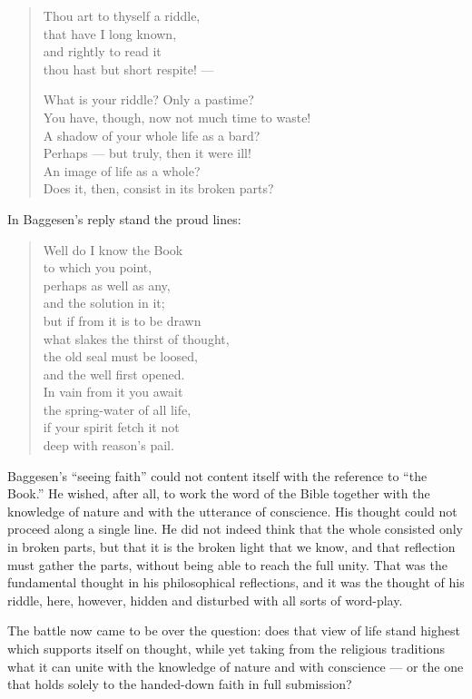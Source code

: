 \documentclass[12pt,a4paper]{book}
\newcommand{\opage}[1]{\marginnote{\footnotesize\textit{[#1]}}}
\begin{document}
\begin{verse}
Thou art to thyself a riddle,\\
that have I long known,\\
and rightly to read it\\
thou hast but short respite! ---

What is your riddle? Only a pastime?\\
You have, though, now not much time to waste!\\
A shadow of your whole life as a bard?\\
Perhaps --- but truly, then it were ill!\\
An image of life as a whole?\\
Does it, then, consist in its broken parts?
\end{verse}

In Baggesen's reply stand the proud lines:

\begin{verse}
Well do I know the Book\\
to which you point,\\
perhaps as well as any,\\
and the solution in it;\\
\opage{70}but if from it is to be drawn\\
what slakes the thirst of thought,\\
the old seal must be loosed,\\
and the well first opened.\\
In vain from it you await\\
the spring-water of all life,\\
if your spirit fetch it not\\
deep with reason's pail.
\end{verse}

Baggesen's ``seeing faith'' could not content itself with the reference to ``the
Book.'' He wished, after all, to work the word of the Bible together with the knowledge
of nature and with the utterance of conscience. His thought could not proceed along a
single line. He did not indeed think that the whole consisted only in broken parts, but
that it is the broken light that we know, and that reflection must gather the parts,
without being able to reach the full unity. That was the fundamental thought in his
philosophical reflections, and it was the thought of his riddle, here, however, hidden
and disturbed with all sorts of word-play.

The battle now came to be over the question: does that view of life stand highest which
supports itself on thought, while yet taking from the religious traditions what it can
unite with the knowledge of nature and with conscience --- or the one that holds solely
to the handed-down faith in full submission?
\end{document}
